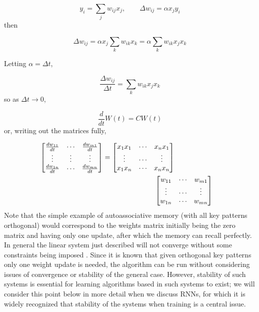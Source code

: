 \begin{equation*}
  y_i = \sum_{j} w_{ij} x_j, \qquad \Delta w_{ij} = \alpha x_j y_i
\end{equation*}
%
then

\begin{equation*}
\Delta w_{ij} = \alpha x_j \sum_k w_{ik} x_k = \alpha \sum_k w_{ik}x_j x_k
\end{equation*}

Letting $\alpha = \Delta t$,

\begin{equation*}
  \frac{\Delta w_{ij}}{\Delta t} = \sum_k w_{ik}x_j x_k
\end{equation*}
%
so as $\Delta t \rightarrow 0$,

\begin{equation*}
\frac{d}{dt}W(t) = C W(t)
\end{equation*}
%
or, writing out the matrices fully,

\begin{equation*}
  \begin{split}
  \begin{bmatrix}
    \frac{dw_{11}}{dt} & \cdots & \frac{dw_{m1}}{dt} \\
    \vdots & \vdots & \vdots \\
    \frac{dw_{1n}}{dt} & \cdots & \frac{dw_{mn}}{dt} \\    
  \end{bmatrix} = \begin{bmatrix}
    x_1 x_1 & \cdots & x_n x_1 \\
    \vdots & \cdots & \vdots \\
    x_1 x_n & \cdots & x_n x_n 
  \end{bmatrix} \\
  & \hspace{-1.0cm}\begin{bmatrix}
    w_{11} & \cdots & w_{m1} \\
    \vdots & \cdots & \vdots \\
    w_{1n} & \cdots & w_{mn}
    \end{bmatrix}
  \end{split}
\end{equation*}
%
Note that the simple example of autoassociative memory (with all key patterns orthogonal) would correspond to the weights matrix initially being the zero matrix and having only one update, after which the memory can recall perfectly. In general the linear system just described will not converge without some constraints being imposed \cite[p. 40]{fyfe2000}. Since it is known that given orthogonal key patterns only one weight update is needed, the algorithm can be run without considering issues of convergence or stability of the general case. However, stability of such systems is essential for learning algorithms based in such systems to exist; we will consider this point below in more detail when we discuss RNNs, for which it is widely recognized that stability of the systems when training is a central issue.

